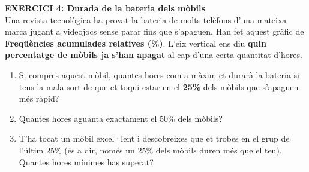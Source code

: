 \documentclass[12pt,a4paper]{article}
\begin{document}
\noindent \textbf{EXERCICI 4: Durada de la bateria dels mòbils} \\
Una revista tecnològica ha provat la bateria de molts telèfons d'una mateixa marca jugant a videojocs sense parar fins que s'apaguen. Han fet aquest gràfic de \textbf{Freqüències acumulades relatives (\%)}. 
L'eix vertical ens diu \textbf{quin percentatge de mòbils ja s'han apagat} al cap d'una certa quantitat d'hores.

\begin{center}
\end{center}

\begin{enumerate}[label=\alph*)]
    \item Si compres aquest mòbil, quantes hores com a màxim et durarà la bateria si tens la mala sort de que et toqui estar en el \textbf{25\%} dels mòbils que s'apaguen més ràpid? \vspace{1.5cm}
    \item Quantes hores aguanta exactament el 50\% dels mòbils? \vspace{1.5cm}
    \item T'ha tocat un mòbil excel·lent i descobreixes que et trobes en el grup de l'últim 25\% (és a dir, només un 25\% dels mòbils duren més que el teu). Quantes hores mínimes has superat? \vspace{1.5cm}
\end{enumerate}
\end{document}
